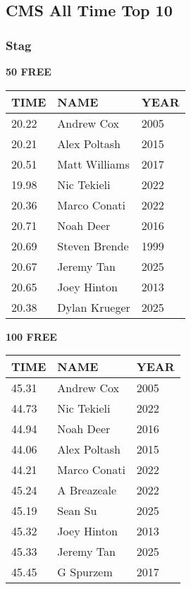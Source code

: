 \vspace{0.4cm}

\newpage

\subsection{CMS All Time Top 10}
\subsubsection{Stag}

\begin{minipage}[t]{0.48\textwidth}
\centering
\textbf{50 FREE}\\[0.05cm]
\begin{tabular}{@{}p{1.8cm}p{2.8cm}p{1.2cm}@{}}
\hline
\textbf{TIME} & \textbf{NAME} & \textbf{YEAR} \\
\hline
20.22 & Andrew Cox & 2005 \\
20.21 & Alex Poltash & 2015 \\
20.51 & Matt Williams & 2017 \\
19.98 & Nic Tekieli & 2022 \\
20.36 & Marco Conati & 2022 \\
20.71 & Noah Deer & 2016 \\
20.69 & Steven Brende & 1999 \\
20.67 & Jeremy Tan & 2025 \\
20.65 & Joey Hinton & 2013 \\
20.38 & Dylan Krueger & 2025 \\
\hline
\end{tabular}
\end{minipage}\hfill
\begin{minipage}[t]{0.48\textwidth}
\centering
\textbf{100 FREE}\\[0.05cm]
\begin{tabular}{@{}p{1.8cm}p{2.8cm}p{1.2cm}@{}}
\hline
\textbf{TIME} & \textbf{NAME} & \textbf{YEAR} \\
\hline
45.31 & Andrew Cox & 2005 \\
44.73 & Nic Tekieli & 2022 \\
44.94 & Noah Deer & 2016 \\
44.06 & Alex Poltash & 2015 \\
44.21 & Marco Conati & 2022 \\
45.24 & A Breazeale & 2022 \\
45.19 & Sean Su & 2025 \\
45.32 & Joey Hinton & 2013 \\
45.33 & Jeremy Tan & 2025 \\
45.45 & G Spurzem & 2017 \\
\hline
\end{tabular}
\end{minipage}

